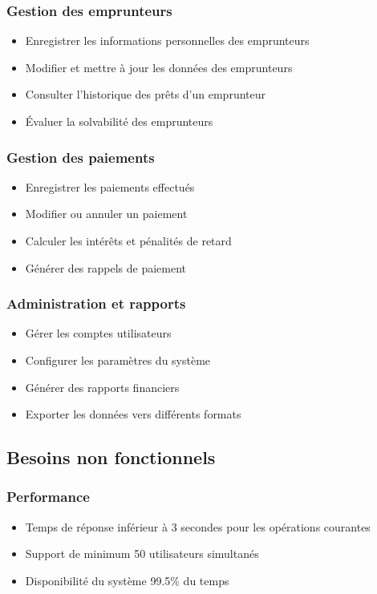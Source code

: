 \documentclass[12pt,a4paper]{report}
\begin{document}
\subsubsection{Gestion des emprunteurs}
\begin{itemize}
    \item Enregistrer les informations personnelles des emprunteurs
    \item Modifier et mettre à jour les données des emprunteurs
    \item Consulter l'historique des prêts d'un emprunteur
    \item Évaluer la solvabilité des emprunteurs
\end{itemize}

\subsubsection{Gestion des paiements}
\begin{itemize}
    \item Enregistrer les paiements effectués
    \item Modifier ou annuler un paiement
    \item Calculer les intérêts et pénalités de retard
    \item Générer des rappels de paiement
\end{itemize}

\subsubsection{Administration et rapports}
\begin{itemize}
    \item Gérer les comptes utilisateurs
    \item Configurer les paramètres du système
    \item Générer des rapports financiers
    \item Exporter les données vers différents formats
\end{itemize}

\subsection{Besoins non fonctionnels}

\subsubsection{Performance}
\begin{itemize}
    \item Temps de réponse inférieur à 3 secondes pour les opérations courantes
    \item Support de minimum 50 utilisateurs simultanés
    \item Disponibilité du système 99.5\% du temps
\end{itemize}
\end{document}

